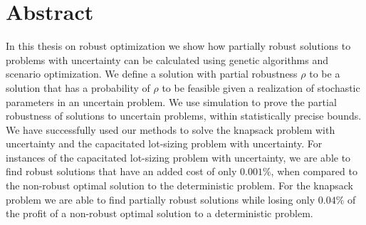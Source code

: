 \section*{Abstract}
\label{sec:abstract}
In this thesis on robust optimization we show how partially robust
solutions to problems with uncertainty can be calculated using genetic
algorithms and scenario optimization. We define a solution with
partial robustness $\rho$ to be a solution that has a probability of
$\rho$ to be feasible given a realization of stochastic parameters in
an uncertain problem. We use simulation to prove the partial
robustness of solutions to uncertain problems, within statistically
precise bounds. We have successfully used our methods to solve the
knapsack problem with uncertainty and the capacitated lot-sizing
problem with uncertainty. For instances of the capacitated lot-sizing
problem with uncertainty, we are able to find robust solutions that
have an added cost of only $0.001\%$, when compared to the non-robust
optimal solution to the deterministic problem. For the knapsack
problem we are able to find partially robust solutions while losing
only $0.04\%$ of the profit of a non-robust optimal solution to a
deterministic problem.

